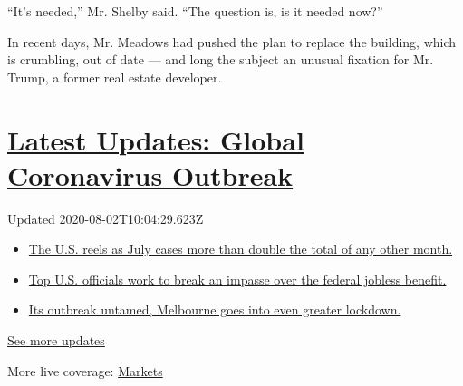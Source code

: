 ``It's needed,'' Mr. Shelby said. ``The question is, is it needed now?''

In recent days, Mr. Meadows had pushed the plan to replace the building,
which is crumbling, out of date --- and long the subject an unusual
fixation for Mr. Trump, a former real estate developer.

\hypertarget{latest-updates-global-coronavirus-outbreak}{%
\section{\texorpdfstring{\href{https://www.nytimes.com/2020/08/01/world/coronavirus-covid-19.html?action=click\&pgtype=Article\&state=default\&region=MAIN_CONTENT_1\&context=storylines_live_updates}{Latest
Updates: Global Coronavirus
Outbreak}}{Latest Updates: Global Coronavirus Outbreak}}\label{latest-updates-global-coronavirus-outbreak}}

Updated 2020-08-02T10:04:29.623Z

\begin{itemize}
\tightlist
\item
  \href{https://www.nytimes.com/2020/08/01/world/coronavirus-covid-19.html?action=click\&pgtype=Article\&state=default\&region=MAIN_CONTENT_1\&context=storylines_live_updates\#link-34047410}{The
  U.S. reels as July cases more than double the total of any other
  month.}
\item
  \href{https://www.nytimes.com/2020/08/01/world/coronavirus-covid-19.html?action=click\&pgtype=Article\&state=default\&region=MAIN_CONTENT_1\&context=storylines_live_updates\#link-780ec966}{Top
  U.S. officials work to break an impasse over the federal jobless
  benefit.}
\item
  \href{https://www.nytimes.com/2020/08/01/world/coronavirus-covid-19.html?action=click\&pgtype=Article\&state=default\&region=MAIN_CONTENT_1\&context=storylines_live_updates\#link-2bc8948}{Its
  outbreak untamed, Melbourne goes into even greater lockdown.}
\end{itemize}

\href{https://www.nytimes.com/2020/08/01/world/coronavirus-covid-19.html?action=click\&pgtype=Article\&state=default\&region=MAIN_CONTENT_1\&context=storylines_live_updates}{See
more updates}

More live coverage:
\href{https://www.nytimes.com/live/2020/07/31/business/stock-market-today-coronavirus?action=click\&pgtype=Article\&state=default\&region=MAIN_CONTENT_1\&context=storylines_live_updates}{Markets}

